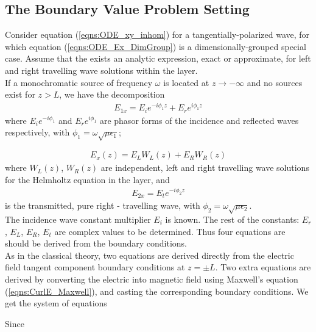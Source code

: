 \documentclass[twocolumn,secnumarabic,amssymb, nobibnotes, aps, prd]{revtex4-1}
\begin{document}
\subsection{The Boundary Value Problem Setting}
Consider equation (\ref{eqns:ODE_xy_inhom}) for a tangentially-polarized wave, for which equation (\ref{eqns:ODE_Ex_DimGroup}) is a dimensionally-grouped special case. Assume that the exists an analytic expression, exact or approximate, for left and right travelling wave solutions within the layer.\\
If a monochromatic source of frequency $\omega$ is located at $z \rightarrow -\infty$ and no sources exist for $z>L$, we have the decomposition
\begin{align}
E_{1x} = E_{i}e^{-i \phi_1 z} + E_{r}e^{i \phi_1 z}
\end{align}
where $E_i e^{-i \phi_1}$ and $E_r e^{i \phi_1}$ are phasor forms of the incidence and reflected waves respectively, with $\phi_1 = \omega \sqrt{\mu \epsilon_1}$;

\begin{align}
E_x(z) = E_L W_L(z) + E_R W_R(z)
\end{align}
where $W_L(z)$, $W_R(z)$ are independent, left and right travelling wave solutions for the Helmholtz equation in the layer, and 
\begin{align}
E_{2x} = E_t e^{-i \phi_2 z}
\end{align}
is the transmitted, pure right - travelling wave, with $\phi_2 = \omega \sqrt{\mu \epsilon_2}$.\\
The incidence wave constant multiplier $E_i$ is known. The rest of the constants: $E_r$, $E_L$, $E_R$, $E_t$ are complex values to be  determined. Thus four equations are should be derived from the boundary conditions. \\ 
As in the classical theory, two equations are derived directly from the electric field tangent component boundary conditions at $z=\pm L$.  Two extra equations are derived by converting the electric into magnetic field using Maxwell's equation (\ref{eqns:CurlE_Maxwell}),  and casting the corresponding boundary conditions. We get the system of equations


Since 
  
\end{document}
